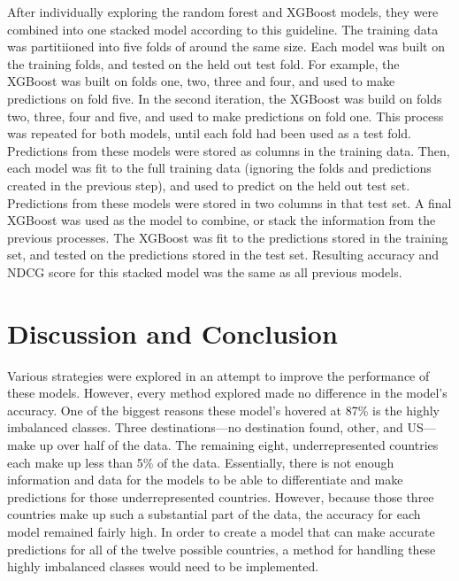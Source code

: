 \documentclass{article}
\begin{document}
After individually exploring the random forest and XGBoost models, they were combined into one 
stacked model according to this guideline. The training data was partitiioned into five folds of around the 
same size. Each model was built on the training folds, and tested on the held out test fold. For example, 
the XGBoost was built on folds one, two, three and four, and used to make predictions on fold five. In the 
second iteration, the XGBoost was build on folds two, three, four and five, and used to make predictions on
fold one. This process was repeated for both models, until each fold had been used as a test fold. Predictions 
from these models were stored as columns in the training data. Then, each model was fit to the full training data
(ignoring the folds and predictions created in the previous step), and used to predict on the held out test set. 
Predictions from these models were stored in two columns in that test set. A final XGBoost was used as the model 
to combine, or stack the information from the previous processes. The XGBoost was fit to the predictions stored
in the training set, and tested on the predictions stored in the test set. Resulting accuracy and NDCG score 
for this stacked model was the same as all previous models. 

\section{Discussion and Conclusion}

Various strategies were explored in an attempt to improve the performance of these models. However, 
every method explored made no difference in the model's accuracy. One of the biggest reasons these model's 
hovered at 87\% is the highly imbalanced classes. Three destinations---no destination found, other, and US---make 
up over half of the data. The remaining eight, underrepresented countries each make up less than 5\% of the data. 
Essentially, there is not enough information and data for the models to be able to differentiate 
and make predictions for those underrepresented countries. However, because those three countries make up 
such a substantial part of the data, the accuracy for each model remained fairly high. In order to create a model
that can make accurate predictions for all of the twelve possible countries, a method for handling these
highly imbalanced classes would need to be implemented. 
\end{document}

